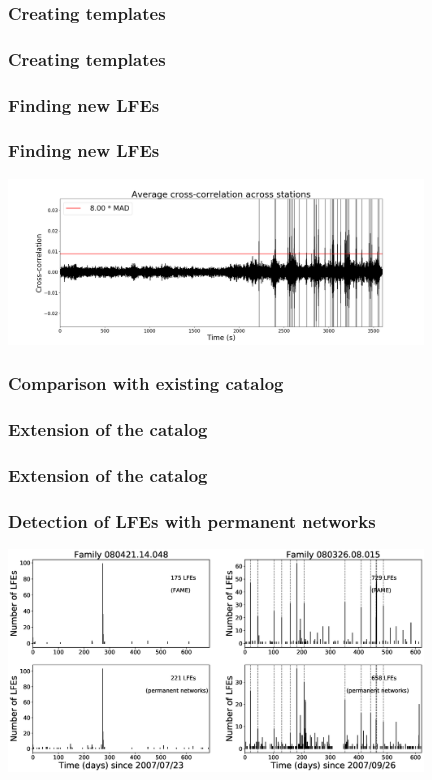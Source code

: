 \documentclass{beamer}
\begin{document}
	\begin{frame}
		\frametitle{Creating templates}
	\end{frame}

	\begin{frame}
		\frametitle{Creating templates}
	\end{frame}

	\begin{frame}
		\frametitle{Finding new LFEs}
	\end{frame}

	\begin{frame}
		\frametitle{Finding new LFEs}
		\begin{center}
			\includegraphics[width=11cm, trim={0cm 0cm 0cm 0cm}, clip]{other/20080421_130000.png}
		\end{center}
	\end{frame}

	\begin{frame}
		\frametitle{Comparison with existing catalog}
	\end{frame}

	\begin{frame}
		\frametitle{Extension of the catalog}
	\end{frame}
	
	\begin{frame}
		\frametitle{Extension of the catalog}
	\end{frame}

	\begin{frame}
		\frametitle{Detection of LFEs with permanent networks}
		\begin{center}
			\includegraphics[width=11cm, trim={0cm 0cm 0cm 0cm}, clip]{other/Figure2.eps}
		\end{center}
	\end{frame}
\end{document}
